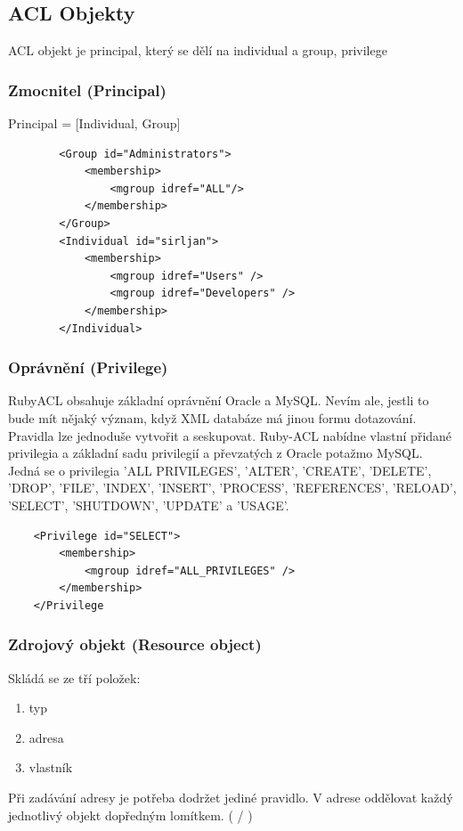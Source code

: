 \subsection{ACL Objekty}
ACL objekt je principal, který se dělí na individual a group, privilege

\subsubsection {Zmocnitel (Principal)}
Principal = [Individual, Group]
\begin{verbatim}
        <Group id="Administrators">
            <membership>
                <mgroup idref="ALL"/>
            </membership>
        </Group>
        <Individual id="sirljan">
            <membership>
                <mgroup idref="Users" />
                <mgroup idref="Developers" />
            </membership>
        </Individual>
\end{verbatim}

\subsubsection {Oprávnění (Privilege)}
RubyACL obsahuje základní oprávnění Oracle a MySQL. Nevím ale, jestli to bude mít nějaký význam, když XML databáze má jinou formu dotazování. 
Pravidla lze jednoduše vytvořit a seskupovat.
Ruby-ACL nabídne vlastní přidané privilegia a základní sadu privilegií a převzatých z Oracle potažmo MySQL. Jedná se o privilegia 'ALL PRIVILEGES', 'ALTER', 'CREATE', 'DELETE', 'DROP', 'FILE', 'INDEX', 'INSERT', 'PROCESS', 'REFERENCES', 'RELOAD', 'SELECT', 'SHUTDOWN', 'UPDATE' a 'USAGE'.
\begin{verbatim}
    <Privilege id="SELECT">
        <membership>             
            <mgroup idref="ALL_PRIVILEGES" />         
        </membership>
    </Privilege
\end{verbatim}

\subsubsection {Zdrojový objekt (Resource object)}
Skládá se ze tří položek:
\begin{enumerate}
\item typ
\item adresa
\item vlastník
\end{enumerate}

Při zadávání adresy je potřeba dodržet jediné pravidlo. V adrese oddělovat každý jednotlivý objekt dopředným lomítkem. ( / )

